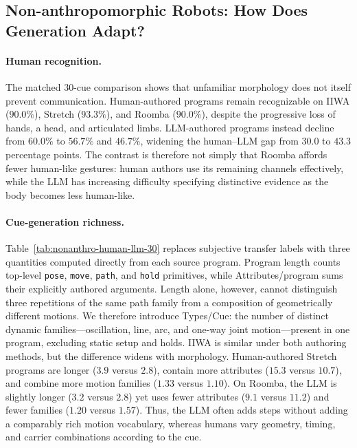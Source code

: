 \documentclass[letterpaper,10pt,conference]{ieeeconf}
\begin{document}
\subsection{Non-anthropomorphic Robots: How Does Generation Adapt?}
\label{sec:results-nonanthro}
\paragraph{Human recognition.} The matched 30-cue comparison shows that unfamiliar morphology does not itself prevent communication. Human-authored programs remain recognizable on IIWA ($90.0\%$), Stretch ($93.3\%$), and Roomba ($90.0\%$), despite the progressive loss of hands, a head, and articulated limbs. LLM-authored programs instead decline from $60.0\%$ to $56.7\%$ and $46.7\%$, widening the human--LLM gap from $30.0$ to $43.3$ percentage points. The contrast is therefore not simply that Roomba affords fewer human-like gestures: human authors use its remaining channels effectively, while the LLM has increasing difficulty specifying distinctive evidence as the body becomes less human-like.



\paragraph{Cue-generation richness.} Table~\ref{tab:nonanthro-human-llm-30} replaces subjective transfer labels with three quantities computed directly from each source program. Program length counts top-level \texttt{pose}, \texttt{move}, \texttt{path}, and \texttt{hold} primitives, while Attributes/program sums their explicitly authored arguments. Length alone, however, cannot distinguish three repetitions of the same path family from a composition of geometrically different motions. We therefore introduce Types/Cue: the number of distinct dynamic families---oscillation, line, arc, and one-way joint motion---present in one program, excluding static setup and holds. IIWA is similar under both authoring methods, but the difference widens with morphology. Human-authored Stretch programs are longer ($3.9$ versus $2.8$), contain more attributes ($15.3$ versus $10.7$), and combine more motion families ($1.33$ versus $1.10$). On Roomba, the LLM is slightly longer ($3.2$ versus $2.8$) yet uses fewer attributes ($9.1$ versus $11.2$) and fewer families ($1.20$ versus $1.57$). Thus, the LLM often adds steps without adding a comparably rich motion vocabulary, whereas humans vary geometry, timing, and carrier combinations according to the cue.
\end{document}
